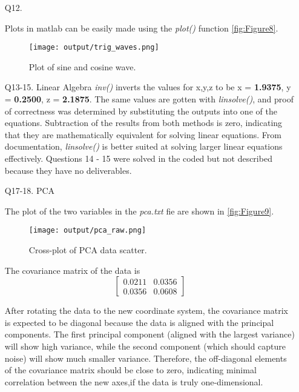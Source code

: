 \documentclass[12pt]{report}
\begin{document}
\begin{enumerate}
    \newpage
    \item[Q12.]

    Plots in matlab can be easily made using the \emph{plot()} function \autoref{fig:Figure8}.
    
    \begin{figure}[ht!]
        \texttt{[image: output/trig\_waves.png]}
        \centering
        \caption{Plot of sine and cosine wave.}
        \label{fig:Figure8}
    \end{figure}

    \item[Q13-15.] Linear Algebra
    \emph{inv()} inverts the values for x,y,z to be x = \textbf{1.9375}, y = \textbf{0.2500}, z = \textbf{2.1875}.
    The same values are gotten with \emph{linsolve()}, and proof of correctness was determined by substituting
    the outputs into one of the equations.  Subtraction of the results from both methods is zero, indicating that they
    are mathematically equivalent for solving linear equations. From documentation, \emph{linsolve()} is better 
    suited at solving larger linear equations effectively. Questions 14 - 15 were solved in the coded but not 
    described because they have no deliverables.

    \item[Q17-18.] PCA

    The plot of the two variables in the \emph{pca.txt} fie are shown in \autoref{fig:Figure9}. 
    
    \begin{figure}[ht!]
        \texttt{[image: output/pca\_raw.png]}
        \centering
        \caption{Cross-plot of PCA data scatter.}
        \label{fig:Figure9}
    \end{figure}

    The covariance matrix of the data is 
    $$
    \begin{bmatrix}
    0.0211 & 0.0356 \\
    0.0356 & 0.0608
    \end{bmatrix}
    $$

    \newpage
    After rotating the data to the new coordinate system, the covariance matrix is expected to be 
    diagonal because the data is aligned with the principal components. The first principal component 
    (aligned with the largest variance) will show high variance, while the second component (which 
    should capture noise) will show much smaller variance. Therefore, the off-diagonal elements of the 
    covariance matrix should be close to zero, indicating minimal correlation between the new axes,if 
    the data is truly one-dimensional.


\end{enumerate}
\end{document}

